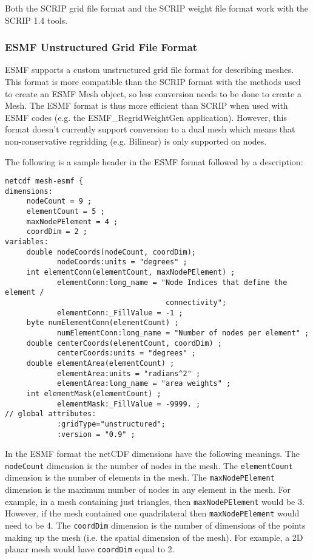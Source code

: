 Both the SCRIP grid file format and the SCRIP weight file format work with the SCRIP 1.4 tools.

\subsubsection{ESMF Unstructured Grid File Format}\label{sec:fileformat:esmf}

ESMF supports a custom unstructured grid file format for describing meshes. This format is more compatible than the SCRIP format with the methods used to create an ESMF Mesh object, so less conversion needs to be done to create a Mesh.
The ESMF format is thus more efficient than SCRIP when used with ESMF codes (e.g. the ESMF\_RegridWeightGen application). However, this
format doesn't currently support conversion to a dual mesh which means that non-conservative regridding (e.g. Bilinear) is only supported on nodes.

The following is a sample header in the ESMF format followed by a description:

\begin{verbatim}
netcdf mesh-esmf {
dimensions:
     nodeCount = 9 ;
     elementCount = 5 ;
     maxNodePElement = 4 ;
     coordDim = 2 ;
variables:
     double nodeCoords(nodeCount, coordDim);
            nodeCoords:units = "degrees" ;
     int elementConn(elementCount, maxNodePElement) ;
            elementConn:long_name = "Node Indices that define the element /
                                     connectivity";
            elementConn:_FillValue = -1 ;
     byte numElementConn(elementCount) ;
            numElementConn:long_name = "Number of nodes per element" ;
     double centerCoords(elementCount, coordDim) ;
            centerCoords:units = "degrees" ;
     double elementArea(elementCount) ;
            elementArea:units = "radians^2" ;
            elementArea:long_name = "area weights" ;
     int elementMask(elementCount) ;
            elementMask:_FillValue = -9999. ;
// global attributes:
            :gridType="unstructured";
            :version = "0.9" ;
\end{verbatim}

 In the ESMF format the netCDF dimensions have the following meanings. The {\tt nodeCount} dimension is the number of nodes in the mesh.
 The {\tt elementCount} dimension is the number of elements in the mesh. The {\tt maxNodePElement} dimension is the maximum number
 of nodes in any element in the mesh. For example, in a mesh containing just triangles, then {\tt maxNodePElement} would be 3. However,
 if the mesh contained one quadrilateral then {\tt maxNodePElement} would need to be 4. The {\tt coordDim} dimension is the number of dimensions
 of the points making up the mesh (i.e. the spatial dimension of the mesh). For example, a 2D planar mesh would have {\tt coordDim} equal to 2.

